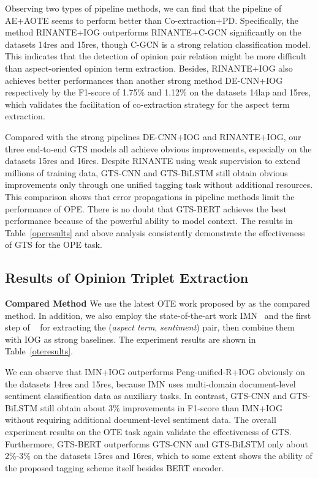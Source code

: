 \documentclass[11pt,a4paper]{article}
\begin{document}
Observing two types of pipeline methods, we can find that the pipeline of AE+AOTE seems to perform better than Co-extraction+PD. Specifically, the method RINANTE+IOG outperforms RINANTE+C-GCN significantly on the datasets 14res and 15res, though C-GCN is a strong relation classification model. This indicates that the detection of opinion pair relation might be more difficult than aspect-oriented opinion term extraction. Besides, RINANTE+IOG also achieves better performances than another strong method DE-CNN+IOG respectively by the F1-score of 1.75\% and 1.12\% on the datasets 14lap and 15res, which validates the facilitation of co-extraction strategy for the aspect term extraction.

Compared with the strong pipelines DE-CNN+IOG and RINANTE+IOG, our three end-to-end GTS models all achieve obvious improvements, especially on the datasets 15res and 16res. Despite RINANTE using weak supervision to extend millions of training data, GTS-CNN and GTS-BiLSTM still obtain obvious improvements only through one unified tagging task without additional resources. This comparison shows that error propagations in pipeline methods limit the performance of OPE. There is no doubt that GTS-BERT achieves the best performance because of the powerful ability to model context. The results in Table~\ref{operesults} and above analysis consistently demonstrate the effectiveness of GTS for the OPE task.




\subsection{Results of Opinion Triplet Extraction}
\textbf{Compared Method} We use the latest OTE work proposed by  as the compared method. In addition, we also employ the state-of-the-art work IMN~\cite{DBLP:conf/acl/HeLND19} and the first step of ~ for extracting the (\emph{aspect term}, \emph{sentiment}) pair, then combine them with IOG as strong baselines. The experiment results are shown in Table~\ref{oteresults}.


We can observe that IMN+IOG outperforms Peng-unified-R+IOG obviously on the datasets 14res and 15res, because IMN uses multi-domain document-level sentiment classification data as auxiliary tasks. In contrast, GTS-CNN and GTS-BiLSTM still obtain about 3\% improvements in F1-score than IMN+IOG without requiring additional document-level sentiment data. The overall experiment results on the OTE task again validate the effectiveness of GTS. Furthermore, GTS-BERT outperforms GTS-CNN and GTS-BiLSTM only about 2\%-3\% on the datasets 15res and 16res, which to some extent shows the ability of the proposed tagging scheme itself besides BERT encoder.
\end{document}

